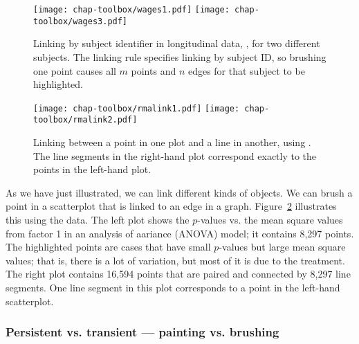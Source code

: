 \begin{figure}[htp]
\centerline{
  \texttt{[image: chap-toolbox/wages1.pdf]}
  \texttt{[image: chap-toolbox/wages3.pdf]}}
\caption[Linking by subject identifier]  {Linking by subject
identifier in longitudinal data, , for two different
subjects.  The linking rule specifies linking by subject ID, so
brushing one point causes all $m$ points and $n$ edges for that
subject to be highlighted. }
\label{mtonlinking}
\end{figure}


\begin{figure}[htp]
\begin{center}
\texttt{[image: chap-toolbox/rmalink1.pdf]}
\texttt{[image: chap-toolbox/rmalink2.pdf]}
\end{center}
\caption[Linking between a point in one plot and a line in another,
using ]{Linking between a point in
one plot and a line in another, using . The line segments in the right-hand plot correspond
exactly to the points in the left-hand plot.}
\label{linking}
\end{figure}

As we have just illustrated, we can link different kinds of objects.
We can brush a point in a scatterplot that is linked to an edge in a
graph.  Figure~\ref{linking} illustrates
this using the  data. The left plot
shows the $p$-values vs. the mean square values from factor 1 in an
analysis of aariance (ANOVA) model; it contains 8,297 points.
The highlighted points are cases that have small $p$-values but large
mean square values; that is, there is a lot of variation, but most of
it is due to the treatment. The right plot contains 16,594 points
that are paired and connected by 8,297 line segments. One line
segment in this plot corresponds to a point in the left-hand
scatterplot.

\subsubsection{Persistent vs. transient --- painting vs. brushing}


